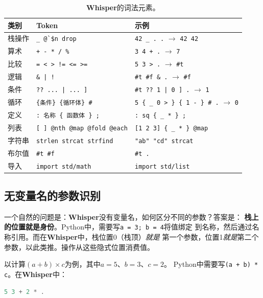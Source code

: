 \documentclass[11pt,a4paper]{ctexart}
\begin{document}
\begin{table}[ht]
\centering
\caption{\textbf{Whisper}的词法元素。}
\label{tab:lexical}
\begin{tabular}{lll}
\toprule
\textbf{类别} & \textbf{Token} & \textbf{示例} \\
\midrule
栈操作 & \texttt{\_ \` @ \$n drop} & \texttt{42 \_ . .} $\rightarrow$ \texttt{42 42} \\
算术 & \texttt{+ - * / \%} & \texttt{3 4 + .} $\rightarrow$ \texttt{7} \\
比较 & \texttt{= < > != <= >=} & \texttt{5 3 > .} $\rightarrow$ \texttt{\#t} \\
逻辑 & \texttt{\& | !} & \texttt{\#t \#f \& .} $\rightarrow$ \texttt{\#f} \\
条件 & \texttt{?? ... | ... ]} & \texttt{\#t ?? 1 | 0 ] .} $\rightarrow$ \texttt{1} \\
循环 & \texttt{\{条件\} \{循环体\} \#} & \texttt{5 \{ \_ 0 > \} \{ 1 - \} \# .} $\rightarrow$ \texttt{0} \\
定义 & \texttt{: 名称 \{ 函数体 \} ;} & \texttt{: sq \{ \_ * \} ;} \\
列表 & \texttt{[ ] @nth @map @fold @each} & \texttt{[1 2 3] \{ \_ * \} @map} \\
字符串 & \texttt{strlen strcat strfind} & \texttt{"ab" "cd" strcat} \\
布尔值 & \texttt{\#t \#f} & \texttt{\#t .} \\
导入 & \texttt{import std/math} & \texttt{import std/list} \\
\bottomrule
\end{tabular}
\end{table}

\subsection{无变量名的参数识别}

一个自然的问题是：\textbf{Whisper}没有变量名，如何区分不同的参数？答案是：
\textbf{栈上的位置就是身份}。Python中，需要写\texttt{a = 3; b = 4}将值绑定
到名称，然后通过名称引用。而在\textbf{Whisper}中，栈位置0（栈顶）\textit{就是}
第一个参数，位置1\textit{就是}第二个参数，以此类推。操作从这些隐式位置消费值。

以计算$(a + b) \times c$为例，其中$a = 5$、$b = 3$、$c = 2$。
Python中需要写\texttt{(a + b) * c}。在\textbf{Whisper}中：

\begin{lstlisting}[language=C,basicstyle=\ttfamily\small]
5 3 + 2 * .
\end{lstlisting}
\end{document}
